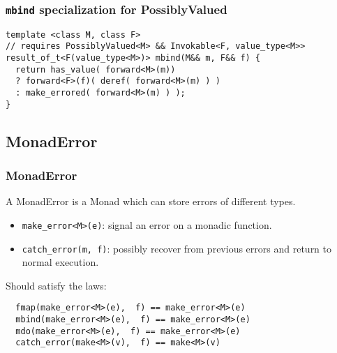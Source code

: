 \documentclass[xcolor=dvipsnames]{beamer}
\newcommand{\cpp}[1]{\lstinline{#1}}
\begin{document}
\begin{frame}[fragile]
\frametitle{\cpp{mbind}  specialization for PossiblyValued}
       
\begin{lstlisting}
template <class M, class F>
// requires PossiblyValued<M> && Invokable<F, value_type<M>>
result_of_t<F(value_type<M>)> mbind(M&& m, F&& f) {
  return has_value( forward<M>(m))
  ? forward<F>(f)( deref( forward<M>(m) ) )
  : make_errored( forward<M>(m) ) );
}
\end{lstlisting}
         
\end{frame}
\subsection{MonadError}
\begin{frame}[fragile]
\frametitle{MonadError}

A MonadError is a Monad which can store errors of different types.

\begin{itemize}
  \item \cpp{make_error<M>(e)}: signal an error on a monadic function.
  \item \cpp{catch_error(m, f)}: possibly recover from previous errors and return to normal execution.
\end{itemize}

Should satisfy the laws:

\begin{lstlisting}
  fmap(make_error<M>(e),  f) == make_error<M>(e)
  mbind(make_error<M>(e),  f) == make_error<M>(e)
  mdo(make_error<M>(e),  f) == make_error<M>(e)
  catch_error(make<M>(v),  f) == make<M>(v)
\end{lstlisting}
\end{frame}
\end{document}
